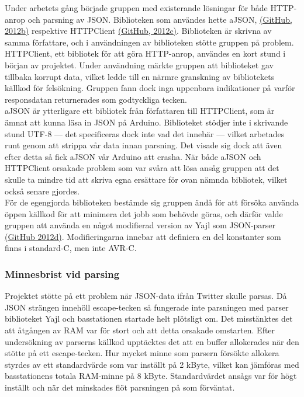 \documentclass[a4paper,11pt]{article}
\begin{document}
Under arbetets gång började gruppen med existerande lösningar för både HTTP-anrop och parsning av JSON. Biblioteken som användes hette aJSON, \hyperref[github]{(GitHub, 2012b)} respektive HTTPClient \hyperref[github]{(GitHub, 2012c)}. Biblioteken är skrivna av samma författare, och i användningen av biblioteken stötte gruppen på problem.\\

HTTPClient, ett bibliotek för att göra HTTP-anrop, användes en kort stund i början av projektet. Under användning märkte gruppen att biblioteket gav tillbaka korrupt data, vilket ledde till en närmre granskning av bibliotekets källkod för felsökning. Gruppen fann dock inga uppenbara indikationer på varför responsdatan returnerades som godtyckliga tecken.\\

aJSON är ytterligare ett bibliotek från författaren till HTTPClient, som är ämnat att kunna läsa in JSON på Arduino. Biblioteket stödjer inte i skrivande stund UTF-8 — det specificeras dock inte vad det innebär — vilket arbetades runt genom att strippa vår data innan parsning. Det visade sig dock att även efter detta så fick aJSON vår Arduino att crasha. När både aJSON och HTTPClient orsakade problem som var svåra att lösa ansåg gruppen att det skulle ta mindre tid att skriva egna ersättare för ovan nämnda bibliotek, vilket också senare gjordes.\\

För de egengjorda biblioteken bestämde sig gruppen ändå för att försöka använda öppen källkod för att minimera det jobb som behövde göras, och därför valde gruppen att använda en något modifierad version av Yajl som JSON-parser \hyperref[github]{(GitHub 2012d)}. Modifieringarna innebar att definiera en del konstanter som finns i standard-C, men inte AVR-C.

\subsubsection{Minnesbrist vid parsing}
Projektet stötte på ett problem när JSON-data ifrån Twitter skulle parsas. Då JSON strängen innehöll escape-tecken så fungerade inte parsningen med parser biblioteket Yajl och basstationen startade helt plötsligt om. Det misstänktes det att åtgången av RAM var för stort och att detta orsakade omstarten. Efter undersökning av parserns källkod upptäcktes det att en buffer allokerades när den stötte på ett escape-tecken. Hur mycket minne som parsern försökte allokera styrdes av ett standardvärde som var inställt på 2 kByte, vilket kan jämföras med basstationens totala RAM-minne på 8 kByte. Standardvärdet ansågs var för högt inställt och när det minskades flöt parsningen på som förväntat.
\end{document}
